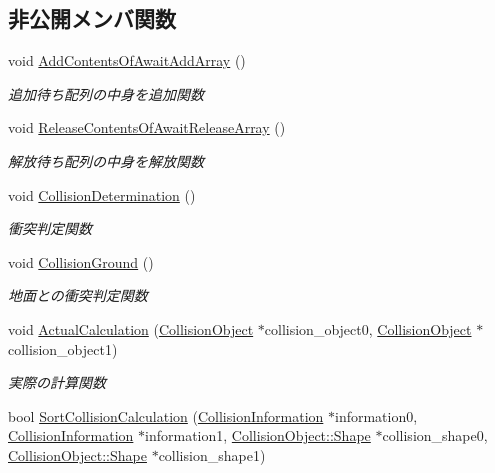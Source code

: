 \subsection*{非公開メンバ関数}
\begin{DoxyCompactItemize}
\item 
void \mbox{\hyperlink{class_collision_manager_a53e468bb8624f84a5c65c9779781033f}{Add\+Contents\+Of\+Await\+Add\+Array}} ()
\begin{DoxyCompactList}\small\item\em 追加待ち配列の中身を追加関数 \end{DoxyCompactList}\item 
void \mbox{\hyperlink{class_collision_manager_a351353ddde07f2ff4f6642c8e1fc4ede}{Release\+Contents\+Of\+Await\+Release\+Array}} ()
\begin{DoxyCompactList}\small\item\em 解放待ち配列の中身を解放関数 \end{DoxyCompactList}\item 
void \mbox{\hyperlink{class_collision_manager_a67c1ebc4d4a19e06122f11c3eeec89ec}{Collision\+Determination}} ()
\begin{DoxyCompactList}\small\item\em 衝突判定関数 \end{DoxyCompactList}\item 
void \mbox{\hyperlink{class_collision_manager_a1d67f4076eb71e191db5cff4e5abe3b0}{Collision\+Ground}} ()
\begin{DoxyCompactList}\small\item\em 地面との衝突判定関数 \end{DoxyCompactList}\item 
void \mbox{\hyperlink{class_collision_manager_afe96885d766cf78376c5a8f929ab3c39}{Actual\+Calculation}} (\mbox{\hyperlink{class_collision_object}{Collision\+Object}} $\ast$collision\+\_\+object0, \mbox{\hyperlink{class_collision_object}{Collision\+Object}} $\ast$collision\+\_\+object1)
\begin{DoxyCompactList}\small\item\em 実際の計算関数 \end{DoxyCompactList}\item 
bool \mbox{\hyperlink{class_collision_manager_a0b3ce179f879bfcfb1c6c51a49fd8a79}{Sort\+Collision\+Calculation}} (\mbox{\hyperlink{class_collision_information}{Collision\+Information}} $\ast$information0, \mbox{\hyperlink{class_collision_information}{Collision\+Information}} $\ast$information1, \mbox{\hyperlink{class_collision_object_1_1_shape}{Collision\+Object\+::\+Shape}} $\ast$collision\+\_\+shape0, \mbox{\hyperlink{class_collision_object_1_1_shape}{Collision\+Object\+::\+Shape}} $\ast$collision\+\_\+shape1)

\end{DoxyCompactItemize}
